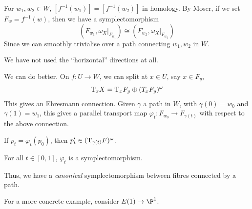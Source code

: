 \documentclass{article}
\begin{document}
For \(w_1, w_2 \in W\), \([f^{-1}(w_1)] = [f^{-1}(w_2)]\) in homology. By Moser, if we set \(F_w = f^{-1}(w)\), then we have a symplectomorphism
\[(F_{w_1}, \omega_X\vert_{F_{w_1}}) \cong (F_{w_2}, \omega_X\vert_{F_{w_2}})\]
Since we can smoothly trivialise over a path connecting \(w_1, w_2\) in \(W\).

\begin{remark}
    We have not used the ``horizontal'' directions at all.
\end{remark}

We can do better. On \(f : U \to W\), we can split at \(x \in U\), say \(x \in F_y\),
\[\mathrm{T}_xX = \mathrm{T}_xF_y \oplus (T_xF_y)^\omega\]
This gives an Ehresmann connection. Given \(\gamma\) a path in \(W\), with \(\gamma(0) = w_0\) and \(\gamma(1) = w_1\), this gives a parallel transport map \(\varphi_t : F_{w_0} \to F_{\gamma(t)}\) with respect to the above connection.

If \(p_t = \varphi_t(p_0)\), then \(p_t' \in (\mathrm{T}_{\gamma(t)}F)^\omega\).

\begin{proposition}
    For all \(t \in [0, 1]\), \(\varphi_t\) is a symplectomorphism.
\end{proposition}

Thus, we have a \emph{canonical} symplectomorphism between fibres connected by a path.

For a more concrete example, consider \(E(1) \to \P^1\).

\printindex
\end{document}
